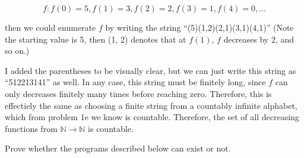 \documentclass[11pt]{article}
\begin{document}
\begin{Parts}
\begin{solution}
      \[ f: f(0) = 5, f(1) = 3, f(2) = 2, f(3) = 1, f(4) = 0, \dots\]

      then we could enumerate $f$ by writing the string ``(5)(1,2)(2,1)(3,1)(4,1)'' (Note the starting value is 5, then (1, 2) denotes that at $f(1)$, $f$ decreases by 2, and so on.)
      
      I added the parentheses to be visually clear, but we can just write this string as ``512213141'' as well. In any case, this string must be finitely long, since $f$ can only decreases finitely many times before reaching zero. Therefore, this is effectiely the same as choosing a finite string from a countably infinite alphabet, which from problem 1e we know is countable. Therefore, the set of all decreasing functions from $\mathbb N \to \mathbb N$ is countable.
    \end{solution}
\end{Parts}
\pagebreak
{}

Prove whether the programs described below can exist or not.
\end{document}

